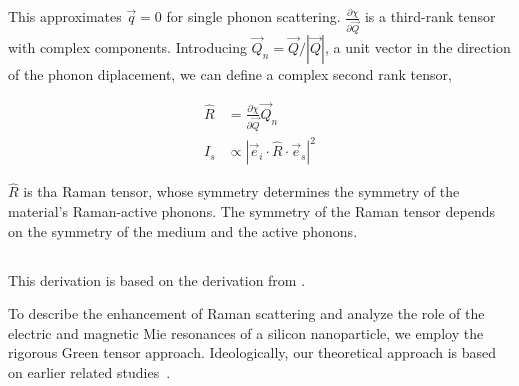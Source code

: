         This approximates $\vec{q} = 0$ for single phonon scattering. $\frac{\partial\chi}{\partial\vec{Q}}$ is a third-rank tensor with
        complex components. Introducing $\vec{Q}_n = \vec{Q}/|\vec{Q}|$, a unit vector in the direction of the phonon diplacement, we can
        define a complex second rank tensor,

        \begin{align}
            \hat{R} &= \frac{\partial\chi}{\partial\vec{Q}}\vec{Q}_n \\
            I_s &\propto | \vec{e}_i \cdot \hat{R} \cdot\vec{e}_s|^2
        \end{align}

        $\hat{R}$ is tha Raman tensor, whose symmetry determines the symmetry of the material's Raman-active phonons. The symmetry of the
        Raman tensor depends on the symmetry of the medium and the active phonons.

    \subsection{}
        \label{sec:Theory}
            This derivation is based on the derivation from \cite{dmitriev2016resonant}.

            To describe the enhancement of Raman scattering and analyze the role of the electric and magnetic
        Mie resonances of a silicon nanoparticle, we employ the rigorous Green tensor approach. Ideologically,
        our theoretical approach is based on earlier related studies~\cite{canccado2014theory, murphy1983enhanced}.

